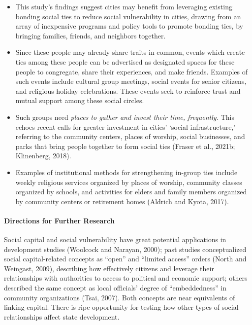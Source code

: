 \documentclass[]{elsarticle} %
\begin{document}
\begin{itemize}
\item
  This study's findings suggest cities may benefit from leveraging
  existing bonding social ties to reduce social vulnerability in cities,
  drawing from an array of inexpensive programs and policy tools to
  promote bonding ties, by bringing families, friends, and neighbors
  together.
\item
  Since these people may already share traits in common, events which
  create ties among these people can be advertised as designated spaces
  for these people to congregate, share their experiences, and make
  friends. Examples of such events include cultural group meetings,
  social events for senior citizens, and religious holiday celebrations.
  These events seek to reinforce trust and mutual support among these
  social circles.
\item
  Such groups need \emph{places to gather and invest their time,
  frequently.} This echoes recent calls for greater investment in
  cities' `social infrastructure,' referring to the community centers,
  places of worship, social businesses, and parks that bring people
  together to form social ties (Fraser et al., 2021b; Klinenberg, 2018).
\item
  Examples of institutional methods for strengthening in-group ties
  include weekly religious services organized by places of worship,
  community classes organized by schools, and activities for elders and
  family members organized by community centers or retirement homes
  (Aldrich and Kyota, 2017).
\end{itemize}

\hypertarget{directions-for-further-research}{%
\paragraph{Directions for Further
Research}\label{directions-for-further-research}}

Social capital and social vulnerability have great potential
applications in development studies (Woolcock and Narayan, 2000); past
studies conceptualized social capital-related concepts as ``open'' and
``limited access'' orders (North and Weingast, 2009), describing how
effectively citizens and leverage their relationships with authorities
to access to political and economic support; others described the same
concept as local officials' degree of ``embeddedness'' in community
organizations (Tsai, 2007). Both concepts are near equivalents of
linking capital. There is ripe opportunity for testing how other types
of social relationships affect state development.
\end{document}
